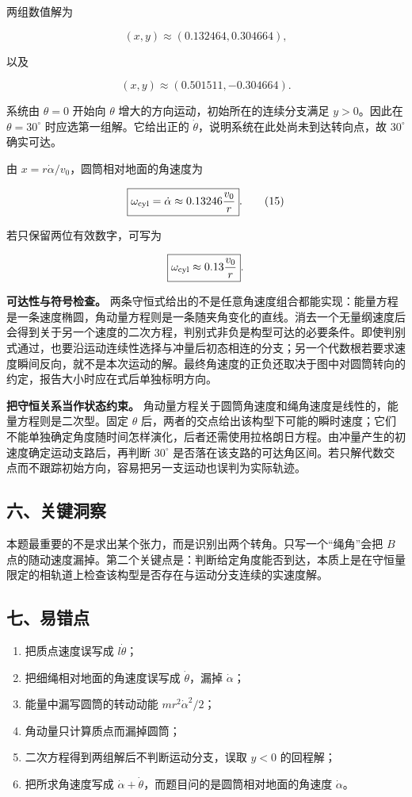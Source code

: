 \documentclass[12pt,a4paper,UTF8]{ctexart}
\newcommand{\tightlist}{\setlength{\itemsep}{0pt}\setlength{\parskip}{0pt}}
\begin{document}
两组数值解为

\[
(x,y)\approx(0.132464,0.304664),
\]

以及

\[
(x,y)\approx(0.501511,-0.304664).
\]

系统由 \(\theta=0\) 开始向 \(\theta\)
增大的方向运动，初始所在的连续分支满足 \(y>0\)。因此在
\(\theta=30^\circ\) 时应选第一组解。它给出正的
\(\dot\theta\)，说明系统在此处尚未到达转向点，故 \(30^\circ\) 确实可达。

由 \(x=r\dot\alpha/v_0\)，圆筒相对地面的角速度为

\[
\boxed{
\omega_{\rm cyl}=\dot\alpha
\approx0.13246\frac{v_0}{r}
}.
\tag{15}
\]

若只保留两位有效数字，可写为

\[
\boxed{\omega_{\rm cyl}\approx0.13\frac{v_0}{r}}.
\]

\textbf{可达性与符号检查。}
两条守恒式给出的不是任意角速度组合都能实现：能量方程是一条速度椭圆，角动量方程则是一条随夹角变化的直线。消去一个无量纲速度后会得到关于另一个速度的二次方程，判别式非负是构型可达的必要条件。即使判别式通过，也要沿运动连续性选择与冲量后初态相连的分支；另一个代数根若要求速度瞬间反向，就不是本次运动的解。最终角速度的正负还取决于图中对圆筒转向的约定，报告大小时应在式后单独标明方向。

\textbf{把守恒关系当作状态约束。}
角动量方程关于圆筒角速度和绳角速度是线性的，能量方程则是二次型。固定
\(\theta\)
后，两者的交点给出该构型下可能的瞬时速度；它们不能单独确定角度随时间怎样演化，后者还需使用拉格朗日方程。由冲量产生的初速度确定运动支路后，再判断
\(30^\circ\)
是否落在该支路的可达角区间。若只解代数交点而不跟踪初始方向，容易把另一支运动也误判为实际轨迹。

\subsection{六、关键洞察}\label{ux516dux5173ux952eux6d1eux5bdf}

本题最重要的不是求出某个张力，而是识别出两个转角。只写一个``绳角''会把
\(B\)
点的随动速度漏掉。第二个关键点是：判断给定角度能否到达，本质上是在守恒量限定的相轨道上检查该构型是否存在与运动分支连续的实速度解。

\subsection{七、易错点}\label{ux4e03ux6613ux9519ux70b9}

\begin{enumerate}
\def\labelenumi{\arabic{enumi}.}
\tightlist
\item
  把质点速度误写成 \(l\dot\theta\)；
\item
  把细绳相对地面的角速度误写成 \(\dot\theta\)，漏掉 \(\dot\alpha\)；
\item
  能量中漏写圆筒的转动动能 \(mr^2\dot\alpha^2/2\)；
\item
  角动量只计算质点而漏掉圆筒；
\item
  二次方程得到两组解后不判断运动分支，误取 \(y<0\) 的回程解；
\item
  把所求角速度写成
  \(\dot\alpha+\dot\theta\)，而题目问的是圆筒相对地面的角速度
  \(\dot\alpha\)。
\end{enumerate}
\end{document}
